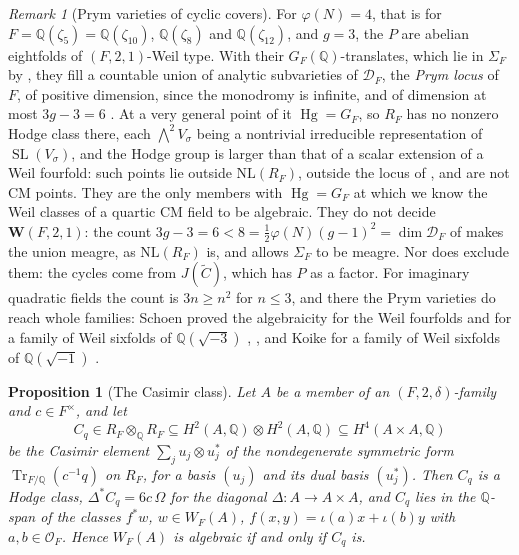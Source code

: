 \documentclass[11pt,reqno]{amsart}
\theoremstyle{plain}
\newtheorem{proposition}[theorem]{Proposition}
\theoremstyle{definition}
\theoremstyle{remark}
\newtheorem{remark}[theorem]{Remark}
\newcommand{\QQ}{\mathbb{Q}}
\newcommand{\cO}{\mathcal{O}}
\newcommand{\cD}{\mathcal{D}}
\DeclareMathOperator{\Hg}{Hg}
\DeclareMathOperator{\Tr}{Tr}
\DeclareMathOperator{\SL}{SL}
\begin{document}
\begin{remark}[Prym varieties of cyclic covers]
For $\varphi(N)=4$, that is for $F=\QQ(\zeta_{5})=\QQ(\zeta_{10})$,
$\QQ(\zeta_{8})$ and $\QQ(\zeta_{12})$, and $g=3$, the $P$ are abelian
eightfolds of $(F,2,1)$-Weil type. With their $G_{F}(\QQ)$-translates, which
lie in $\Sigma_{F}$ by \cite[Theorem~17.7(ii)]{paperI}, they fill a countable
union of analytic subvarieties of $\cD_{F}$, the \emph{Prym locus} of $F$, of
positive dimension, since the monodromy is infinite, and of dimension at most
$3g-3=6$ \cite[pp.~25--26]{Sch88}. At a very general point of it $\Hg=G_{F}$, so
$R_{F}$ has no nonzero Hodge class there, each $\bigwedge^{2}V_{\sigma}$ being
a nontrivial irreducible representation of $\SL(V_{\sigma})$, and the Hodge
group is larger than that of a scalar extension of a Weil fourfold: such
points lie outside $\mathrm{NL}(R_{F})$, outside the locus of
, and are not CM points. They are the only members
with $\Hg=G_{F}$ at which we know the Weil classes of a quartic CM field to be
algebraic. They do not decide $\mathbf{W}(F,2,1)$: the count
$3g-3=6<8=\tfrac12\varphi(N)(g-1)^{2}=\dim\cD_{F}$ of \cite[pp.~25--26]{Sch88}
makes the union meagre, as $\mathrm{NL}(R_{F})$ is, and
\cite[Theorem~17.7(iii)]{paperI} allows $\Sigma_{F}$ to be meagre. Nor does
 exclude them: the cycles come from $J(\widetilde C)$,
which has $P$ as a factor. For imaginary quadratic fields the count is
$3n\ge n^{2}$ for $n\le3$, and there the Prym varieties do reach whole
families: Schoen proved the algebraicity for the Weil fourfolds and for a
family of Weil sixfolds of $\QQ(\sqrt{-3})$ \cite[Theorem~3.2]{Sch88},
\cite{Sch98}, and Koike for a family of Weil sixfolds of $\QQ(\sqrt{-1})$
\cite[Theorem~2.1, Corollary~2.1]{Koi04}.
\end{remark}

\begin{proposition}[The Casimir class]\label{prop:quarticcasimir}
Let $A$ be a member of an $(F,2,\delta)$-family and $c\in F^{\times}$, and let
\[
  C_{q}\in R_{F}\otimes_{\QQ}R_{F}\subseteq H^{2}(A,\QQ)\otimes H^{2}(A,\QQ)
  \subseteq H^{4}(A\times A,\QQ)
\]
be the Casimir element $\sum_{j}u_{j}\otimes u_{j}^{*}$ of the nondegenerate
symmetric form $\Tr_{F/\QQ}(c^{-1}q)$ on $R_{F}$, for a basis $(u_{j})$ and its
dual basis $(u_{j}^{*})$. Then $C_{q}$ is a Hodge class,
$\Delta^{*}C_{q}=6c\,\Omega$ for the diagonal $\Delta\colon A\to A\times A$,
and $C_{q}$ lies in the $\QQ$-span of the classes $f^{*}w$, $w\in W_{F}(A)$,
$f(x,y)=\iota(a)x+\iota(b)y$ with $a,b\in\cO_{F}$. Hence $W_{F}(A)$ is
algebraic if and only if $C_{q}$ is.
\end{proposition}
\end{document}
